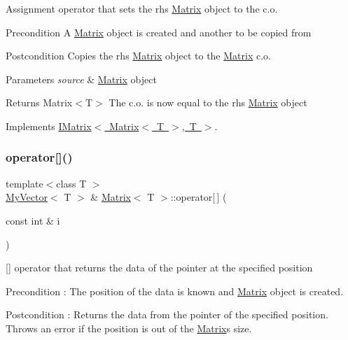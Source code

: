 Assignment operator that sets the rhs \mbox{\hyperlink{class_matrix}{Matrix}} object to the c.\+o. 

\begin{DoxyPrecond}{Precondition}
A \mbox{\hyperlink{class_matrix}{Matrix}} object is created and another to be copied from 
\end{DoxyPrecond}
\begin{DoxyPostcond}{Postcondition}
Copies the rhs \mbox{\hyperlink{class_matrix}{Matrix}} object to the \mbox{\hyperlink{class_matrix}{Matrix}} c.\+o. 
\end{DoxyPostcond}

\begin{DoxyParams}{Parameters}
{\em source} & \mbox{\hyperlink{class_matrix}{Matrix}} object \\
\hline
\end{DoxyParams}
\begin{DoxyReturn}{Returns}
Matrix$<$\+T$>$ The c.\+o. is now equal to the rhs \mbox{\hyperlink{class_matrix}{Matrix}} object 
\end{DoxyReturn}


Implements \mbox{\hyperlink{class_i_matrix}{I\+Matrix$<$ Matrix$<$ T $>$, T $>$}}.

\mbox{\label{class_matrix_aa9532c87a69bef256954e2309ca3fdd6}} 
\subsubsection{\texorpdfstring{operator[]()}{operator[]()}\hspace{0.1cm}{\footnotesize\ttfamily [1/2]}}
{\footnotesize\ttfamily template$<$class T $>$ \\
\mbox{\hyperlink{class_my_vector}{My\+Vector}}$<$ T $>$ \& \mbox{\hyperlink{class_matrix}{Matrix}}$<$ T $>$\+::operator\mbox{[}$\,$\mbox{]} (\begin{DoxyParamCaption}\item[{const int \&}]{i }\end{DoxyParamCaption})\hspace{0.3cm}{\ttfamily [virtual]}}



\mbox{[}\mbox{]} operator that returns the data of the pointer at the specified position 

\begin{DoxyPrecond}{Precondition}
\+: The position of the data is known and \mbox{\hyperlink{class_matrix}{Matrix}} object is created. 
\end{DoxyPrecond}
\begin{DoxyPostcond}{Postcondition}
\+: Returns the data from the pointer of the specified position. Throws an error if the position is out of the \mbox{\hyperlink{class_matrix}{Matrix}}\textquotesingle{}s size. 
\end{DoxyPostcond}

